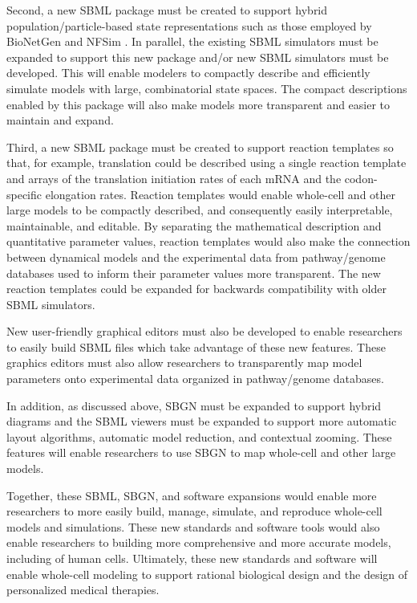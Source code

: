 \documentclass[journal,transmag]{IEEEtran}
\begin{document}
Second, a new SBML package must be created to support hybrid population/particle-based state representations such as those employed by BioNetGen \cite{Hlavacek2006, Hogg2014} and NFSim \cite{Sneddon2011}. In parallel, the existing SBML simulators must be expanded to support this new package and/or new SBML simulators must be developed. This will enable modelers to compactly describe and efficiently simulate models with large, combinatorial state spaces. The compact descriptions enabled by this package will also make models more transparent and easier to maintain and expand. 

Third, a new SBML package must be created to support reaction templates so that, for example, translation could be described using a single reaction template and arrays of the translation initiation rates of each mRNA and the codon-specific elongation rates. Reaction templates would enable whole-cell and other large models to be compactly described, and consequently easily interpretable, maintainable, and editable. By separating the mathematical description and quantitative parameter values, reaction templates would also make the connection between dynamical models and the experimental data from pathway/genome databases used to inform their parameter values more transparent. The new reaction templates could be expanded for backwards compatibility with older SBML simulators.

New user-friendly graphical editors must also be developed to enable researchers to easily build SBML files which take advantage of these new features. These graphics editors must also allow researchers to transparently map model parameters onto experimental data organized in pathway/genome databases.

In addition, as discussed above, SBGN must be expanded to support hybrid diagrams and the SBML viewers must be expanded to support more automatic layout algorithms, automatic model reduction, and contextual zooming. These features will enable researchers to use SBGN to map whole-cell and other large models.

Together, these SBML, SBGN, and software expansions would enable more researchers to more easily build, manage, simulate, and reproduce whole-cell models and simulations. These new standards and software tools would also enable researchers to building more comprehensive and more accurate models, including of human cells. Ultimately, these new standards and software will enable whole-cell modeling to support rational biological design and the design of personalized medical therapies.
\end{document}
